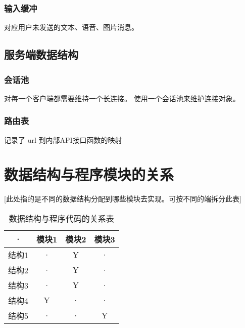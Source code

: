 \subsubsection{输入缓冲}
对应用户未发送的文本、语音、图片消息。

\subsection{服务端数据结构}

\subsubsection{会话池}
对每一个客户端都需要维持一个长连接。
使用一个会话池来维护连接对象。

\subsubsection{路由表}
记录了 url 到内部API接口函数的映射



\section{数据结构与程序模块的关系}
[此处指的是不同的数据结构分配到哪些模块去实现。可按不同的端拆分此表]
\begin{table}[htbp]
\centering
\caption{数据结构与程序代码的关系表} \label{tab:datastructure-module}
\begin{tabular}{|c|c|c|c|}
    \hline
    · & 模块1 & 模块2 & 模块3 \\
    \hline
    结构1 & · & Y & · \\
    \hline
    结构2 & · & Y & · \\
    \hline
    结构3 & · & Y & · \\
    \hline
    结构4 & Y & · & · \\
    \hline
    结构5 & · & · & Y \\
    \hline
\end{tabular}
\end{table}